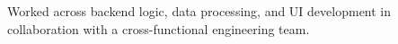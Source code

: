 \documentclass[letterpaper,11pt]{article}
\newcommand{\resumeItem}[1]{
	\item\small{
		{#1 \vspace{-2pt}}
	}
}
\begin{document}
	
	

	
	
	
	



	

	
	

	

	
	\resumeItem{Worked across backend logic, data processing, and UI development in collaboration with a cross-functional engineering team.}
	

	
	
	
	
\end{document}
